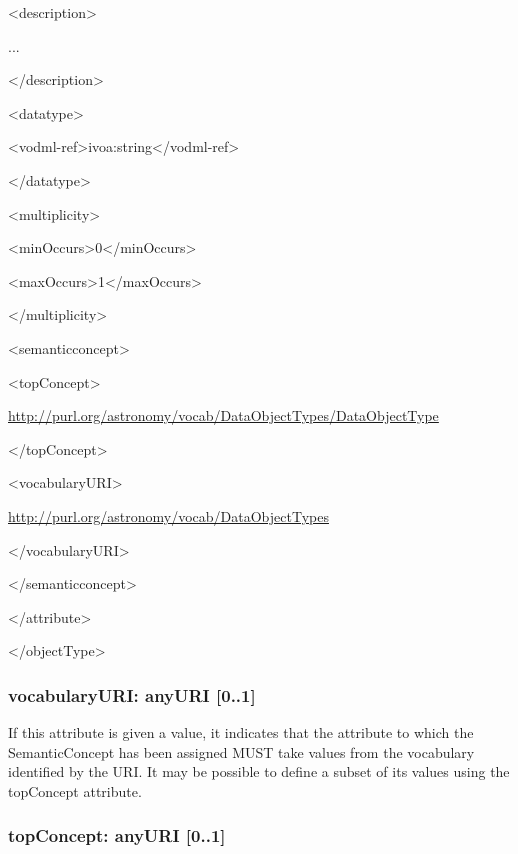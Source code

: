 \documentclass[10pt,a4paper]{ivoa}
\begin{document}
\textless description\textgreater{}

...

\textless/description\textgreater{}

\textless datatype\textgreater{}

\textless vodml-ref\textgreater ivoa:string\textless/vodml-ref\textgreater{}

\textless/datatype\textgreater{}

\textless multiplicity\textgreater{}

\textless minOccurs\textgreater0\textless/minOccurs\textgreater{}

\textless maxOccurs\textgreater1\textless/maxOccurs\textgreater{}

\textless/multiplicity\textgreater{}

\textless semanticconcept\textgreater{}

\textless topConcept\textgreater{}

\url{http://purl.org/astronomy/vocab/DataObjectTypes/DataObjectType}

\textless/topConcept\textgreater{}

\textless vocabularyURI\textgreater{}

\url{http://purl.org/astronomy/vocab/DataObjectTypes}

\textless/vocabularyURI\textgreater{}

\textless/semanticconcept\textgreater{}

\textless/attribute\textgreater{}

\textless/objectType\textgreater{}

\hypertarget{vocabularyuri-anyuri-0..1}{%
\subsubsection{vocabularyURI: anyURI
{[}0..1{]}}\label{vocabularyuri-anyuri-0..1}}

If this attribute is given a value, it indicates that the attribute to
which the SemanticConcept has been assigned MUST take values from the
vocabulary identified by the URI. It may be possible to define a subset
of its values using the topConcept attribute.

\hypertarget{topconcept-anyuri-0..1}{%
\subsubsection{topConcept: anyURI
{[}0..1{]}}\label{topconcept-anyuri-0..1}}
\end{document}
